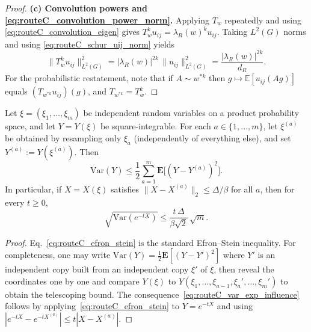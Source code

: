 \begin{proof}
\medskip
\noindent\textbf{(c) Convolution powers and \eqref{eq:routeC_convolution_power_norm}.}
Applying $T_w$ repeatedly and using \eqref{eq:routeC_convolution_eigen} gives $T_w^k u_{ij}=\lambda_R(w)^k u_{ij}$.
Taking $L^2(G)$ norms and using \eqref{eq:routeC_schur_uij_norm} yields
\[
\|T_w^k u_{ij}\|_{L^2(G)}^2
=|\lambda_R(w)|^{2k}\,\|u_{ij}\|_{L^2(G)}^2
=\frac{|\lambda_R(w)|^{2k}}{d_R}.
\]
For the probabilistic restatement, note that if $A\sim w^{*k}$ then
$g\mapsto\mathbb E[u_{ij}(Ag)]$ equals $(T_{w^{*k}}u_{ij})(g)$, and $T_{w^{*k}}=T_w^k$.
\end{proof}

\begin{lemma}\label{lem:routeC_influence_variance}
Let $\xi=(\xi_1,\dots,\xi_m)$ be independent random variables on a product probability space, and let $Y=Y(\xi)$ be square-integrable.
For each $a\in\{1,\dots,m\}$, let $\xi^{(a)}$ be obtained by resampling only $\xi_a$ (independently of everything else), and set $Y^{(a)}:=Y(\xi^{(a)})$.
Then
\begin{equation}\label{eq:routeC_efron_stein}
\mathrm{Var}(Y)\le \frac12\sum_{a=1}^m\mathbf E\bigl[(Y-Y^{(a)})^2\bigr].
\end{equation}
In particular, if $X=X(\xi)$ satisfies $\|X-X^{(a)}\|_2\le \Delta/\beta$ for all $a$, then for every $t\ge 0$,
\begin{equation}\label{eq:routeC_var_exp_influence}
\sqrt{\mathrm{Var}(e^{-tX})}
\le \frac{t\,\Delta}{\beta\sqrt2}\,\sqrt m.
\end{equation}
\end{lemma}

\begin{proof}
Eq.~\eqref{eq:routeC_efron_stein} is the standard Efron--Stein inequality.
For completeness, one may write $\mathrm{Var}(Y)=\frac12\mathbf E[(Y-Y')^2]$ where $Y'$ is an independent copy built from an independent copy $\xi'$ of $\xi$,
then reveal the coordinates one by one and compare $Y(\xi)$ to $Y(\xi_1,\dots,\xi_{a-1},\xi_a',\dots,\xi_m')$ to obtain the telescoping bound.
The consequence~\eqref{eq:routeC_var_exp_influence} follows by applying~\eqref{eq:routeC_efron_stein} to $Y=e^{-tX}$ and using
$|e^{-tX}-e^{-tX^{(a)}}|\le t|X-X^{(a)}|$.
\end{proof}

